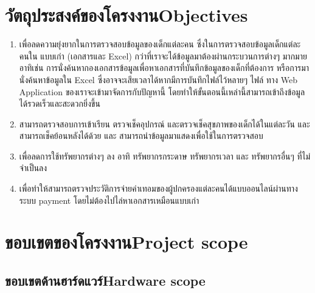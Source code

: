 \section{\ifcpe วัตถุประสงค์ของโครงงาน\else Objectives\fi}
\begin{enumerate}
    \item เพื่อลดความยุ่งยากในการตรวจสอบข้อมูลของเด็กแต่ละคน ซึ่งในการตรวจสอบข้อมูลเด็กแต่ละคนใน แบบเก่า (เอกสารและ Excel) กว่าที่เราจะได้ข้อมูลมาต้องผ่านกระบวนการต่างๆ มากมาย อาทิเช่น การนั่งค้นหากองเอกสารข้อมูลเพื่อหาเอกสารที่บันทึกข้อมูลของเด็กที่ต้องการ หรือการมานั่งค้นหาข้อมูลใน Excel ซึ่งอาจจะเสียเวลาได้หากมีการบันทึกไฟล์ไว้หลายๆ ไฟล์ ทาง Web Application ของเราจะเข้ามาจัดการกับปัญหานี้ โดยทําให้ขั้นตอนนี้เหล่านี้สามารถเข้าถึงข้อมูลได้รวดเร็วและสะดวกยิ่งขึ้น 

    \item สามารถตรวจสอบการเข้าเรียน ตรวจเช็คอุปกรณ์ และตรวจเช็คสุขภาพของเด็กได้ในแต่ละวัน และ  สามารถเช็คย้อนหลังได้ด้วย และ สามารถนําข้อมูลมาแสดงเพื่อใช้ในการตรวจสอบ

    \item เพื่อลดการใช้ทรัพยากรต่างๆ ลง อาทิ ทรัพยากรกระดาษ ทรัพยากรเวลา และ ทรัพยากรอื่นๆ ที่ไม่จําเป็นลง
    \item เพื่อทำให้สามารถตรวจประวัติการจ่ายค่าเทอมของผู้ปกครองแต่ละคนได้แบบออนไลน์ผ่านทางระบบ payment โดยไม่ต้องไปไล่หาเอกสารเหมือนแบบเก่า

\end{enumerate}


\section{\ifcpe ขอบเขตของโครงงาน\else Project scope\fi}

\subsection{\ifcpe ขอบเขตด้านฮาร์ดแวร์\else Hardware scope\fi}


